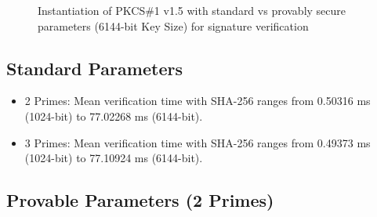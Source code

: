 \documentclass[]{final_report}
\theoremstyle{definition}
\begin{document}
\begin{figure}[H]
    \centering %
     \caption{Instantiation of PKCS\#1 v1.5 with standard vs provably secure parameters (6144-bit Key Size) for signature verification}
    \begin{minipage}{\textwidth}
        \centering
    \end{minipage}
         \label{pkcs_verify_6144bit_table}
\end{figure}




\subsection*{Standard Parameters}
\begin{itemize}
\item 2 Primes: Mean verification time with SHA-256 ranges from 0.50316 ms (1024-bit) to 77.02268 ms (6144-bit).
\item 3 Primes: Mean verification time with SHA-256 ranges from 0.49373 ms (1024-bit) to 77.10924 ms (6144-bit).
\end{itemize}

\subsection*{Provable Parameters (2 Primes)}
\end{document}
